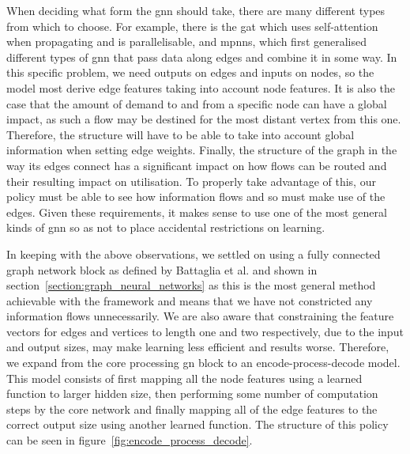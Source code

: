When deciding what form the \ac{gnn} should take, there are many different types from which to choose. For example, there is the \ac{gat}\cite{velivckovic2017graph} which uses self-attention when propagating and is parallelisable, and \acp{mpnn}\cite{gilmer2017neural}, which first generalised different types of \ac{gnn} that pass data along edges and combine it in some way. In this specific problem, we need outputs on edges and inputs on nodes, so the model most derive edge features taking into account node features. It is also the case that the amount of demand to and from a specific node can have a global impact, as such a flow may be destined for the most distant vertex from this one. Therefore, the structure will have to be able to take into account global information when setting edge weights. Finally, the structure of the graph in the way its edges connect has a significant impact on how flows can be routed and their resulting impact on utilisation. To properly take advantage of this, our policy must be able to see how information flows and so must make use of the edges. Given these requirements, it makes sense to use one of the most general kinds of \ac{gnn} so as not to place accidental restrictions on learning.

In keeping with the above observations, we settled on using a fully connected graph network block as defined by Battaglia et al.\cite{battaglia2018relational} and shown in section~\ref{section:graph_neural_networks} as this is the most general method achievable with the framework and means that we have not constricted any information flows unnecessarily. We are also aware that constraining the feature vectors for edges and vertices to length one and two respectively, due to the input and output sizes, may make learning less efficient and results worse. Therefore, we expand from the core processing \ac{gn} block to an encode-process-decode model. This model consists of first mapping all the node features using a learned function to larger hidden size, then performing some number of computation steps by the core network and finally mapping all of the edge features to the correct output size using another learned function. The structure of this policy can be seen in figure~\ref{fig:encode_process_decode}.

